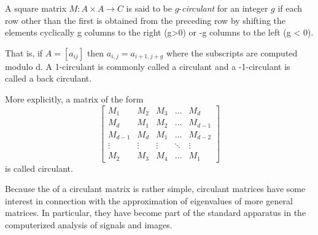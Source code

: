 \documentclass[12pt]{article}
\begin{document}
 
 
A square matrix $M:A\times A\to C$ is said to be $g$-\emph{circulant} for an integer $g$ if each row other than the first is obtained
from the preceding row by shifting the elements cyclically g columns to the right (g>0) or -g columns to the left (g < 0).

That is, if $A=[a_{ij}]$ then
$a_{i,j} = a_{i+1,j+g}$
where the subscripts are computed modulo d.
A 1-circulant is commonly called a circulant
and a -1-circulant is called a back circulant.

More explicitly, a matrix of the form
$$
\left[
\begin{array}{ccccc}
M_1 & M_2 & M_3 &\ldots & M_{d} \\
M_d & M_1 & M_2 & \ldots & M_{d-1}\\
M_{d-1} & M_d & M_1 & \ldots & M_{d-2}\\
\vdots & \vdots& \vdots & \ddots & \vdots \\
M_2 & M_3 & M_4 & \ldots & M_1
\end{array}\right]
$$
is called circulant. 


Because the  of a
circulant matrix is rather simple, circulant matrices have some
interest in connection with the approximation of eigenvalues of
more general matrices. In particular, they have become part of the
standard apparatus in the computerized analysis of signals and images.
\end{document}
